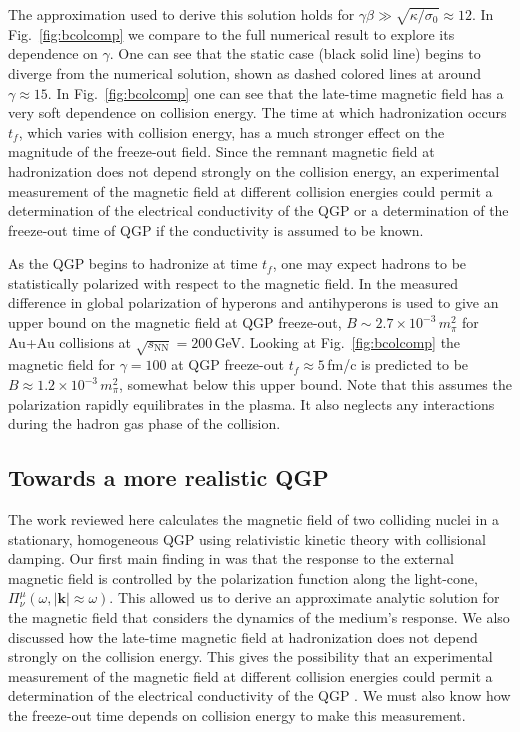 The approximation used to derive this solution holds for $\gamma\beta \gg \sqrt{ \kappa/\sigma_0} \approx 12$. In Fig.~\ref{fig:bcolcomp} we compare  to the full numerical result to explore its dependence on $\gamma$.  One can see that the static case  (black solid line) begins to diverge from the numerical solution, shown as dashed colored lines at around $\gamma \approx 15$.  In Fig.~\ref{fig:bcolcomp} one can see that the late-time magnetic field has a very soft dependence on collision energy. The time at which hadronization occurs $t_f$, which varies with collision energy, has a much stronger effect on the magnitude of the freeze-out field. Since the remnant magnetic field at hadronization does not depend strongly on the collision energy, an experimental measurement of the magnetic field at different collision energies could permit a determination of the electrical conductivity of the QGP or a determination of the freeze-out time of QGP if the conductivity is assumed to be known. 

As the QGP begins to hadronize at time $t_f$, one may expect hadrons to be statistically polarized with respect to the magnetic field. In \cite{Muller:2018ibh} the measured difference in global polarization of hyperons and antihyperons is used to give an upper bound on the magnetic field at QGP freeze-out, $B \sim 2.7\times 10^{-3}\,m_{\pi}^2$ for Au+Au collisions at $\sqrt{s_\text{NN}} = 200$\,GeV. Looking at Fig.~\ref{fig:bcolcomp} the magnetic field for $\gamma = 100$ at QGP freeze-out $t_f \approx 5 $\,fm/c is predicted to be $B \approx 1.2\times 10^{-3}\,m_{\pi}^2$, somewhat below this upper bound. Note that this assumes the polarization rapidly equilibrates in the plasma. It also neglects any interactions during the hadron gas phase of the collision. 

\subsection{Towards a more realistic QGP }\label{sec:ConclusionsQGP}
The work reviewed here calculates the magnetic field of two colliding nuclei in a stationary, homogeneous QGP using relativistic kinetic theory with collisional damping. Our first main finding in \cite{Grayson:2022asf} was that the response to the external magnetic field is controlled by the polarization function along the light-cone, $\Pi^\mu_\nu(\omega ,|\boldsymbol{k}|\approx\omega)$. This allowed us to derive an approximate analytic solution for the magnetic field that considers the dynamics of the medium's response. We also discussed how the late-time magnetic field at hadronization does not depend strongly on the collision energy. This gives the possibility that an experimental measurement of the magnetic field at different collision energies could permit a determination of the electrical conductivity of the QGP \cite{STAR:2023jdd}. We must also know how the freeze-out time depends on collision energy to make this measurement.

